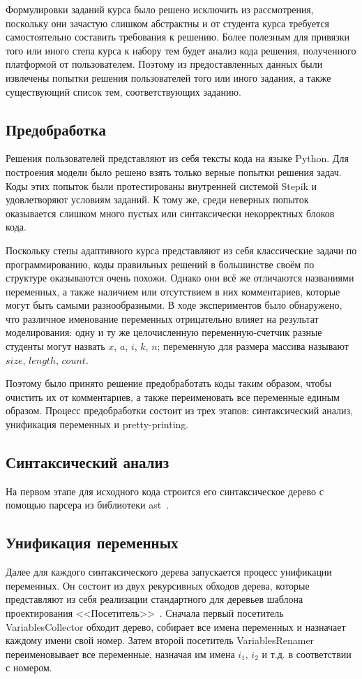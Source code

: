 \documentclass[14pt]{matmex-diploma-custom}
\begin{document}
Формулировки заданий курса было решено исключить из рассмотрения, поскольку они зачастую слишком абстрактны и от студента курса требуется самостоятельно составить требования к решению. Более полезным для привязки того или иного степа курса к набору тем будет анализ кода решения, полученного платформой от пользователем. Поэтому из предоставленных данных были извлечены попытки решения пользователей того или иного задания, а также существующий список тем, соответствующих заданию.

\subsection{Предобработка}
Решения пользователей представляют из себя тексты кода на языке Python. Для построения модели было решено взять только верные попытки решения задач. Коды этих попыток были протестированы внутренней системой Stepik и удовлетворяют условиям заданий. К тому же, среди неверных попыток оказывается слишком много пустых или синтаксически некорректных блоков кода.

Поскольку степы адаптивного курса представляют из себя классические задачи по программированию, коды правильных решений в большинстве своём по структуре оказываются очень похожи. Однако они всё же отличаются названиями переменных, а также наличием или отсутствием в них комментариев, которые могут быть самыми разнообразными. В ходе экспериментов было обнаружено, что различное именование переменных отрицательно влияет на результат моделирования: одну и ту же целочисленную переменную-счетчик разные студенты могут назвать $x$, $a$, $i$, $k$, $n$; переменную для размера массива называют $size$, $length$, $count$.

Поэтому было принято решение предобработать коды таким образом, чтобы очистить их от комментариев, а также переименовать все переменные единым образом. Процесс предобработки состоит из трех этапов: синтаксический анализ, унификация переменных и pretty-printing.

\subsection*{Синтаксический анализ}
На первом этапе для исходного кода строится его синтаксическое дерево с помощью парсера из библиотеки ast~\cite{ast}.

\subsection*{Унификация переменных}
Далее для каждого синтаксического дерева запускается процесс унификации переменных. Он состоит из двух рекурсивных обходов дерева, которые представляют из себя реализации стандартного для деревьев шаблона проектирования <<Посетитель>>~\cite{DesignPatterns}. Сначала первый посетитель VariablesCollector обходит дерево, собирает все имена переменных и назначает каждому имени свой номер. Затем второй посетитель VariablesRenamer переименовывает все переменные, назначая им имена $i_1$, $i_2$ и т.д. в соответствии с номером.
\end{document}
